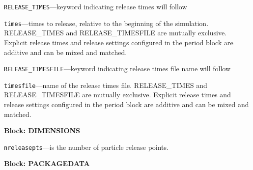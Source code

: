 \begin{description}
\item \texttt{RELEASE\_TIMES}---keyword indicating release times will follow

\item \texttt{times}---times to release, relative to the beginning of the simulation.  RELEASE\_TIMES and RELEASE\_TIMESFILE are mutually exclusive.  Explicit release times and release settings configured in the period block are additive and can be mixed and matched.

\item \texttt{RELEASE\_TIMESFILE}---keyword indicating release times file name will follow

\item \texttt{timesfile}---name of the release times file.  RELEASE\_TIMES and RELEASE\_TIMESFILE are mutually exclusive.  Explicit release times and release settings configured in the period block are additive and can be mixed and matched.

\end{description}
\item \textbf{Block: DIMENSIONS}

\begin{description}
\item \texttt{nreleasepts}---is the number of particle release points.

\end{description}
\item \textbf{Block: PACKAGEDATA}

